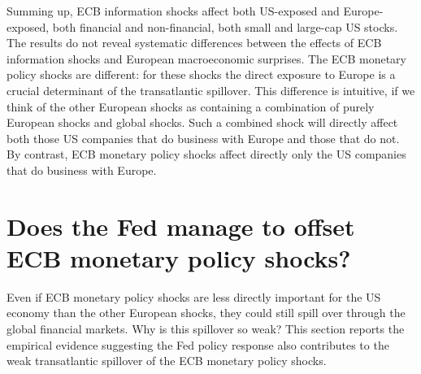 \documentclass[a4paper,12pt]{article}
\begin{document}
Summing up, ECB information shocks affect
both US-exposed and Europe-exposed, both financial and non-financial, both small and large-cap US stocks.
The results do not reveal systematic differences between the effects of ECB information shocks and European macroeconomic surprises.
The ECB monetary policy shocks are different: for these shocks the direct exposure to Europe is a crucial determinant of the transatlantic spillover.
This difference is intuitive, if we think of the other European shocks as containing a combination of purely European shocks and global shocks. Such a combined shock will directly affect both those US companies that do business with Europe and those that do not. By contrast, ECB monetary policy shocks affect directly only the US companies that do business with Europe.

\section{Does the Fed manage to offset ECB monetary policy shocks?}

Even if ECB monetary policy shocks are less directly important for the US economy than the other European shocks, they could still spill over through the global financial markets.
Why is this spillover so weak?
This section reports the empirical evidence suggesting the Fed policy response also contributes to the weak transatlantic spillover of the ECB monetary policy shocks.
\end{document}

